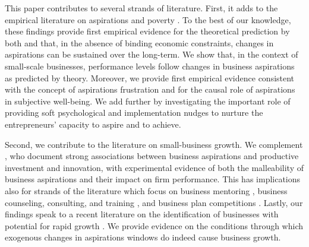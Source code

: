 \documentclass[11.5pt]{article}
\begin{document}
This paper contributes to several strands of literature. First, it adds to the empirical literature on aspirations and poverty \citep[e.g.,][]{Bernard2014, Riley2017, Beaman2012, Janzen2017}. To the best of our knowledge, these findings provide first empirical evidence for the theoretical prediction by both \citet{Genicot2017} and \citet{Dalton2016} that, in the absence of binding economic constraints, changes in aspirations can be sustained over the long-term. We show that, in the context of small-scale businesses, performance levels follow changes in business aspirations as predicted by theory. Moreover, we provide first empirical evidence consistent with the concept of aspirations frustration \citep{Ray2006, Genicot2017} and for the causal role of aspirations in subjective well-being. %
We add further by investigating the important role of providing soft psychological and implementation nudges to nurture the entrepreneurs' capacity to aspire and to achieve.

Second, we contribute to the literature on small-business growth. We complement \citet{Dalton2018}, who document strong associations between business aspirations and productive investment and innovation, with experimental evidence of both the malleability of business aspirations and their impact on firm performance.%
 This has implications also for strands of the literature which focus on business mentoring \citep[e.g.,][]{Brooks2018, Cai2017}, business counseling, consulting, and training \citep[for reviews see,][]{Carpena2017, McKenzie2014}, and business plan competitions \citep[e.g.,][]{McKenzie2017a, Bjorvatn2015}. Lastly, our findings speak to a recent literature on the identification of businesses with potential for rapid growth \citep[see,][]{Fafchamps2016, Fafchamps2017}. We provide evidence on the conditions through which exogenous changes in aspirations windows do indeed cause business growth. %
\end{document}
